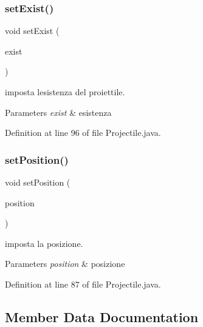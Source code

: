 \subsubsection{\texorpdfstring{set\+Exist()}{setExist()}}
{\footnotesize\ttfamily void set\+Exist (\begin{DoxyParamCaption}\item[{boolean}]{exist }\end{DoxyParamCaption})}



imposta l\textquotesingle{}esistenza del proiettile. 


\begin{DoxyParams}{Parameters}
{\em exist} & esistenza \\
\hline
\end{DoxyParams}


Definition at line 96 of file Projectile.\+java.

\mbox{\label{classobjects_1_1_projectile_a6dd2c1eb5e331c3fbb13d38a440303ba}} 
\subsubsection{\texorpdfstring{set\+Position()}{setPosition()}}
{\footnotesize\ttfamily void set\+Position (\begin{DoxyParamCaption}\item[{Point2\+D.\+Float}]{position }\end{DoxyParamCaption})}



imposta la posizione. 


\begin{DoxyParams}{Parameters}
{\em position} & posizione \\
\hline
\end{DoxyParams}


Definition at line 87 of file Projectile.\+java.



\subsection{Member Data Documentation}
\mbox{\label{classobjects_1_1_projectile_aae5cd11bae27cb7df8bca2fd5fee775e}} 

